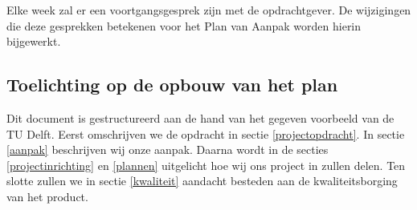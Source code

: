 Elke week zal er een voortgangsgesprek zijn met de opdrachtgever.
De wijzigingen die deze gesprekken betekenen voor het Plan van Aanpak worden hierin bijgewerkt.

\subsection{Toelichting op de opbouw van het plan}

Dit document is gestructureerd aan de hand van het gegeven voorbeeld van de TU Delft.
Eerst omschrijven we de opdracht in sectie \ref{projectopdracht}.
In sectie \ref{aanpak} beschrijven wij onze aanpak.
Daarna wordt in de secties \ref{projectinrichting} en \ref{plannen} uitgelicht hoe wij ons project in zullen delen.
Ten slotte zullen we in sectie \ref{kwaliteit} aandacht besteden aan de kwaliteitsborging van het product.
